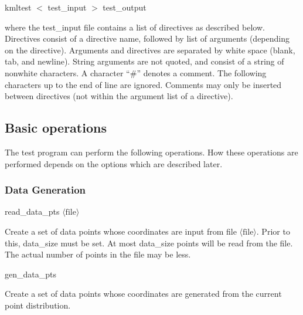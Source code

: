 \documentclass[11pt]{article}		%
\newcommand{\ang}[1]{\langle #1\rangle}
\newenvironment{description*}%
  {\begin{description}%
    \setlength{\itemsep}{-0.5ex}%
    \setlength{\parsep}{0pt}}%
  {\end{description}}
\begin{document}
\begin{center}
	\textsf{kmltest $<$ test\_input $>$ test\_output}
\end{center}
  
where the \textsf{test\_input} file contains a list of directives as
described below.  Directives consist of a directive name, followed by
list of arguments (depending on the directive).  Arguments and
directives are separated by white space (blank, tab, and newline).
String arguments are not quoted, and consist of a string of nonwhite
characters.  A character ``\textsf{\#}'' denotes a comment.  The
following characters up to the end of line are ignored.  Comments may
only be inserted between directives (not within the argument list of a
directive).
  
\subsection{Basic operations}

The test program can perform the following operations.  How these
operations are performed depends on the options which are described
later. 

\newcommand{\BR}[1]{$\ang{\mbox{#1}}$}
\newcommand{\SF}[1]{\textsf{#1}}
  
\subsubsection{Data Generation}
\begin{description*}
\item[\SF{read\_data\_pts \BR{file}}] ~

	Create a set of data points whose coordinates are input from
	file \BR{file}.  Prior to this, data\_size must be set.  At most
	data\_size points will be read from the file.  The actual number
	of points in the file may be less.

\item[\SF{gen\_data\_pts}] ~

	Create a set of data points whose coordinates are generated from
	the current point distribution.
\end{description*}
  
\end{document}
